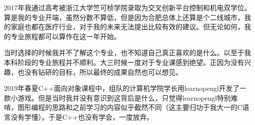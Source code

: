 2017年我通过高考被浙江大学竺可桢学院录取为交叉创新平台控制和机电双学位。算是我的专业开端，虽然分数不算低，但是因为合肥总体上还算是个二线城市，我的家庭也都在医疗行业，对于我的未来无法提出比较有效的建议。但无论如何，我的专业旅程都可以算作在这一年开始。

当时选择的时候我并不了解这个专业，也不知道自己真正喜欢的是什么。以至于我本科阶段的专业旅程并不顺利。大三时候一度对于专业课感到绝望。正因为没有兴趣，也没有钻研的目标，所以最终的成果自然也可以想见。

2019年春夏C++面向对象课程中，组队的计算机学院学长用learnopengl开发了一款小游戏。但是当时我并没有意识到这背后是什么，只觉得learnopengl特别难啃，图形编程的思路和之前学习的内容似乎截然不同（这主要归功于我大一的C语言没有学懂）。于是C++也没有学会，一度放弃。

